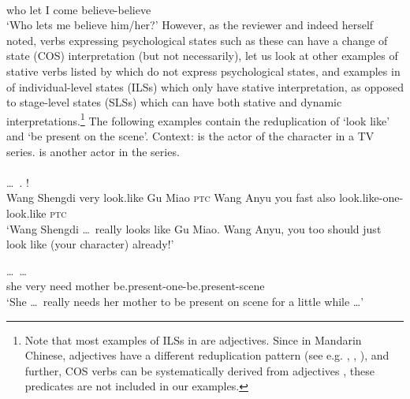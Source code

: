 \documentclass[fleqn,twoside]{article}
\begin{document}
\begin{enumerate}
\ex\label{ex:xiangxin}%
\gll {}    \\
who let I come believe-believe\\
\glt `Who lets me believe him/her?'
\z
However, as the reviewer %
and indeed \citet[669--670]{Tham2013} herself noted,
verbs expressing psychological states such as these can have a change of state (COS) interpretation (but not necessarily),
let us look at other examples of stative verbs listed by \citet[680]{PeckEtAl2013} which do not express psychological states,
and examples in  \citet[Sec. 3.3.3]{XiaoMcEnery2004} of individual-level states (ILSs) which only have stative interpretation,
as opposed to stage-level states (SLSs) which can have both stative and dynamic interpretations.\footnote{
Note that most examples of ILSs in \citet[Sec. 3.3.3]{XiaoMcEnery2004} are adjectives.
Since in Mandarin Chinese, adjectives have a different reduplication pattern (see e.g. \citealt[Sec. 2.2]{Tsao2001}, \citealt[Sec. 4.1]{FanSongBond2015}, \citealt[Sec. 3]{Sui2018}),
and further, COS verbs can be systematically derived from adjectives \citep[Sec. 3]{Tham2013},
these predicates are not included in our examples.}
The following examples contain the reduplication of  `look like' and  `be present on the scene'.
\ea\label{ex:xiang}%
Context:   is the actor of the character   in a TV series.
  is another actor in the series.\\
\\
\gll {}  \ldots\,     .       !\footnotemark\\
Wang Shengdi {} very look.like Gu Miao \textsc{ptc} Wang Anyu you fast also look.like-one-look.like \textsc{ptc}\\
\glt `Wang Shengdi \ldots\,  really looks like Gu Miao. Wang Anyu, you too should just look like (your character) already!'

\ex\label{ex:zaichang}%
 \ldots\,     \ldots\\
she {} very need mother be.present-one-be.present-scene\\
\glt `She \ldots\, really needs her mother to be present on scene for a little while \ldots'
\z
{}


\end{enumerate}
\end{document}
